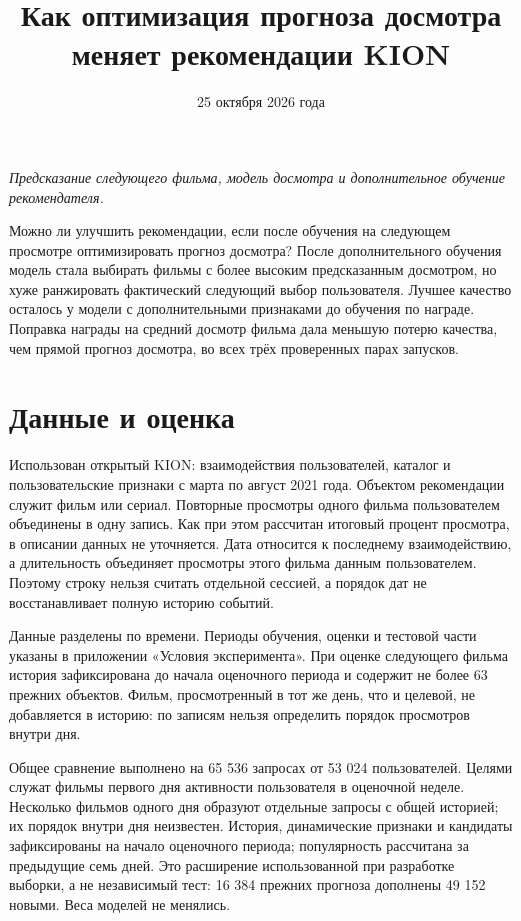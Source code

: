 \documentclass[11pt,a4paper]{article}
\begin{document}
\title{Как оптимизация прогноза досмотра меняет рекомендации KION}
\author{}
\date{25 октября 2026 года}
\maketitle

\emph{Предсказание следующего фильма, модель досмотра и дополнительное обучение рекомендателя.}

Можно ли улучшить рекомендации, если после обучения на следующем просмотре оптимизировать прогноз досмотра? После дополнительного обучения модель стала выбирать фильмы с более высоким предсказанным досмотром, но хуже ранжировать фактический следующий выбор пользователя. Лучшее качество осталось у модели с дополнительными признаками до обучения по награде. Поправка награды на средний досмотр фильма дала меньшую потерю качества, чем прямой прогноз досмотра, во всех трёх проверенных парах запусков.

\section{Данные и оценка}

Использован открытый KION: взаимодействия пользователей, каталог и пользовательские признаки с марта по август 2021 года. Объектом рекомендации служит фильм или сериал. Повторные просмотры одного фильма пользователем объединены в одну запись. Как при этом рассчитан итоговый процент просмотра, в описании данных не уточняется. Дата относится к последнему взаимодействию, а длительность объединяет просмотры этого фильма данным пользователем. Поэтому строку нельзя считать отдельной сессией, а порядок дат не восстанавливает полную историю событий.

Данные разделены по времени. Периоды обучения, оценки и тестовой части указаны в приложении «Условия эксперимента». При оценке следующего фильма история зафиксирована до начала оценочного периода и содержит не более 63 прежних объектов. Фильм, просмотренный в тот же день, что и целевой, не добавляется в историю: по записям нельзя определить порядок просмотров внутри дня.

Общее сравнение выполнено на 65 536 запросах от 53 024 пользователей. Целями служат фильмы первого дня активности пользователя в оценочной неделе. Несколько фильмов одного дня образуют отдельные запросы с общей историей; их порядок внутри дня неизвестен. История, динамические признаки и кандидаты зафиксированы на начало оценочного периода; популярность рассчитана за предыдущие семь дней. Это расширение использованной при разработке выборки, а не независимый тест: 16 384 прежних прогноза дополнены 49 152 новыми. Веса моделей не менялись.
\end{document}
